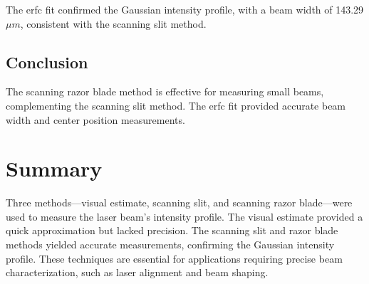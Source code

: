 \documentclass[12pt]{article}
\begin{document}
The erfc fit confirmed the Gaussian intensity profile, with a beam width of 143.29 \(\mu m\), consistent with the scanning slit method.

\subsection{Conclusion}
The scanning razor blade method is effective for measuring small beams, complementing the scanning slit method. The erfc fit provided accurate beam width and center position measurements.

\section{Summary}
Three methods—visual estimate, scanning slit, and scanning razor blade—were used to measure the laser beam's intensity profile. The visual estimate provided a quick approximation but lacked precision. The scanning slit and razor blade methods yielded accurate measurements, confirming the Gaussian intensity profile. These techniques are essential for applications requiring precise beam characterization, such as laser alignment and beam shaping.
\end{document}
